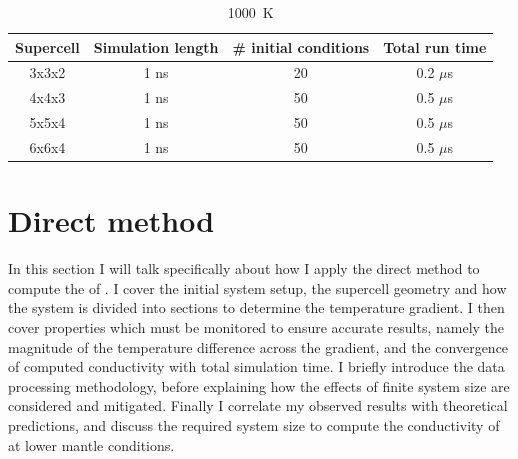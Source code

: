 \begin{table}[h]

\centering
\caption[CONTENTS2]{1000~K}%

\begin{tabular}{cccc}
Supercell                        & Simulation length & \# initial conditions    & Total run time           \\ \hline
3x3x2                             & 1 ns                        & 20                                & 0.2 $\mu$s               \\ \hline
4x4x3                             & 1 ns                        & 50                                & 0.5 $\mu$s               \\ \hline
5x5x4                             & 1 ns                        & 50                                & 0.5 $\mu$s               \\ \hline
6x6x4                             & 1 ns                        & 50                                & 0.5 $\mu$s            
\end{tabular}

\label{tab:gk_fse_times_1K}

\end{table}


\pagebreak


\section{\label{sec:3.direct}Direct method}

In this section I will talk specifically about how I apply the direct method to compute the \tcs of \bdg. I cover the initial system setup, the supercell geometry and how the system is divided into sections to determine the temperature gradient. I then cover properties which must be monitored to ensure accurate results, namely the magnitude of the temperature difference across the gradient, and the convergence of computed conductivity with total simulation time. I briefly introduce the data processing methodology, before explaining how the effects of finite system size are considered and mitigated. Finally I correlate my observed results with theoretical predictions, and discuss the required system size to compute the conductivity of \bdgs at lower mantle conditions.

